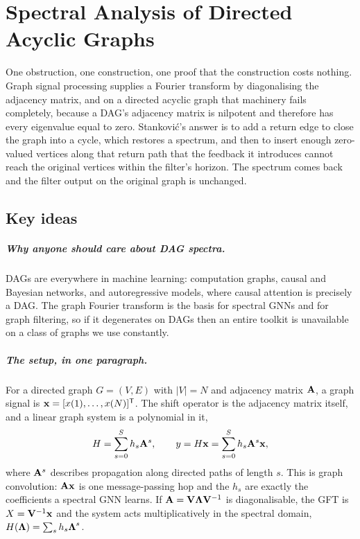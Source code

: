 \chapter{Spectral Analysis of Directed Acyclic Graphs}
\label{ch:09-spectral-analysis-dags}


One obstruction, one construction, one proof that the construction costs nothing. Graph signal processing supplies a Fourier transform by
diagonalising the adjacency matrix, and on a directed acyclic graph that machinery fails
completely, because a DAG's adjacency matrix is nilpotent and therefore has every eigenvalue
equal to zero. Stankovi\'{c}'s answer is to add a return edge to close the graph into a cycle,
which restores a spectrum, and then to insert enough zero-valued vertices along that return path
that the feedback it introduces cannot reach the original vertices within the filter's horizon.
The spectrum comes back and the filter output on the original graph is unchanged.

\section*{Key ideas}

\paragraph{Why anyone should care about DAG spectra.} DAGs are everywhere in machine learning:
computation graphs, causal and Bayesian networks, and autoregressive models, where causal
attention is precisely a DAG. The graph Fourier transform is the basis for spectral GNNs and for
graph filtering, so if it degenerates on DAGs then an entire toolkit is unavailable on a class of
graphs we use constantly.

\paragraph{The setup, in one paragraph.} For a directed graph $G = (V,E)$ with $|V| = N$ and
adjacency matrix $\mathbf{A}$, a graph signal is $\mathbf{x} = [x(1), \dots, x(N)]^{\mathsf{T}}$. The shift operator is
the adjacency matrix itself, and a linear graph system is a polynomial in it,
\[
  H = \sum_{s=0}^{S} h_s \mathbf{A}^{s}, \qquad y = H\mathbf{x} = \sum_{s=0}^{S} h_s \mathbf{A}^{s}\mathbf{x},
\]
\noindent where $\mathbf{A}^{s}$ describes propagation along directed paths of length $s$. This is
graph convolution: $\mathbf{A}\mathbf{x}$ is one message-passing hop and the $h_s$ are exactly the
coefficients a spectral GNN learns. If $\mathbf{A} = \mathbf{V} \boldsymbol{\Lambda} \mathbf{V}^{-1}$ is diagonalisable, the GFT is
$X = \mathbf{V}^{-1} \mathbf{x}$ and the system acts multiplicatively in the spectral domain,
$H(\boldsymbol{\Lambda}) = \sum_s h_s \boldsymbol{\Lambda}^{s}$.

